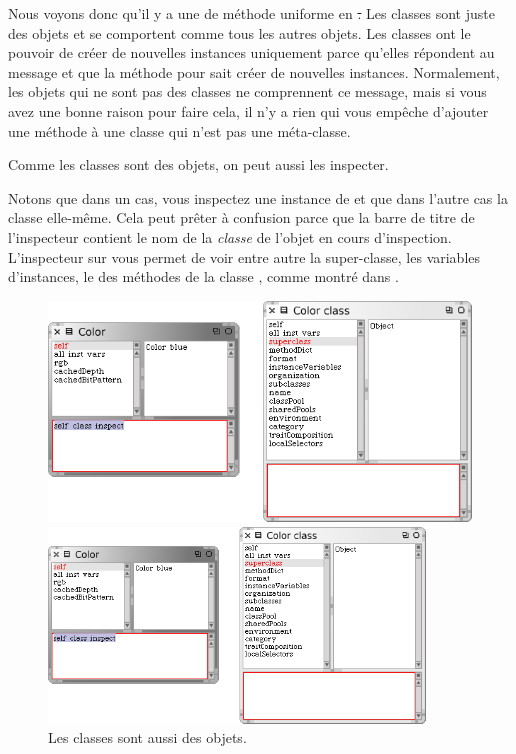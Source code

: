\documentclass[a4paper,10pt,twoside]{book}
\begin{document}
Nous voyons donc qu'il y a une  de méthode uniforme en \st.
Les classes sont juste des objets et se comportent comme tous les autres objets.
Les classes ont le pouvoir de créer de nouvelles instances uniquement parce qu'elles répondent au message  et que la méthode pour  sait créer de nouvelles instances.
Normalement, les objets qui ne sont pas des classes ne comprennent ce message, mais si vous avez une bonne raison pour faire cela, il n'y a rien qui vous empêche d'ajouter une méthode  à une classe qui n'est pas une méta-classe.

Comme les classes sont des objets, on peut aussi les inspecter.


\noindent
Notons que dans un cas, vous inspectez une instance de  et que dans l'autre cas la classe  elle-même.
Cela peut prêter à confusion parce que la barre de titre de l'inspecteur contient le nom de la \emph{classe} de l'objet en cours d'inspection.
L'inspecteur sur  vous permet de voir 
entre autre
la super-classe, les variables d'instances, le  des méthodes 
de  la classe , comme montré dans .

\begin{center}
\begin{figure}[!ht]
\ifluluelse
	{\centerline{\includegraphics[width=\textwidth]{InspectingColor}}}
	{\centerline{\includegraphics[width=10cm]{InspectingColor}}}
\caption{Les classes sont aussi des objets.\label{fig:inspectingColor}}
\end{figure}
\end{center}
\end{document}
